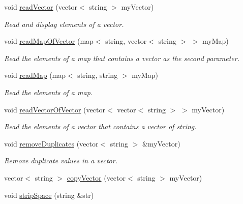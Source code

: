 \begin{DoxyCompactItemize}
void \hyperlink{class_file_operator_aa1c1f1211cbea8bebb6c0e7b2c7eecc1}{readVector} (vector$<$ string $>$ myVector)
\begin{DoxyCompactList}\small\item\em Read and display elements of a vector. \item\end{DoxyCompactList}\item 
void \hyperlink{class_file_operator_aa7ba22f616102b6c5c8cafb0cc4674a4}{readMapOfVector} (map$<$ string, vector$<$ string $>$ $>$ myMap)
\begin{DoxyCompactList}\small\item\em Read the elements of a map that contains a vector as the second parameter. \item\end{DoxyCompactList}\item 
void \hyperlink{class_file_operator_a3d4d4a2be9ad211ef162d40344004534}{readMap} (map$<$ string, string $>$ myMap)
\begin{DoxyCompactList}\small\item\em Read the elements of a map. \item\end{DoxyCompactList}\item 
void \hyperlink{class_file_operator_ae996ae02d43ee6a8bdccb17ab2554af5}{readVectorOfVector} (vector$<$ vector$<$ string $>$ $>$ myVector)
\begin{DoxyCompactList}\small\item\em Read the elements of a vector that contains a vector of string. \item\end{DoxyCompactList}\item 
void \hyperlink{class_file_operator_a734020c4a1a391ea037d2360bf0d56ca}{removeDuplicates} (vector$<$ string $>$ \&myVector)
\begin{DoxyCompactList}\small\item\em Remove duplicate values in a vector. \item\end{DoxyCompactList}\item 
vector$<$ string $>$ \hyperlink{class_file_operator_acbde2414b81392915439e2a03e6882d3}{copyVector} (vector$<$ string $>$ myVector)
\item 
void \hyperlink{class_file_operator_ab15fea72899b46ef473997f5735c7b7a}{stripSpace} (string \&str)
\end{DoxyCompactItemize}


